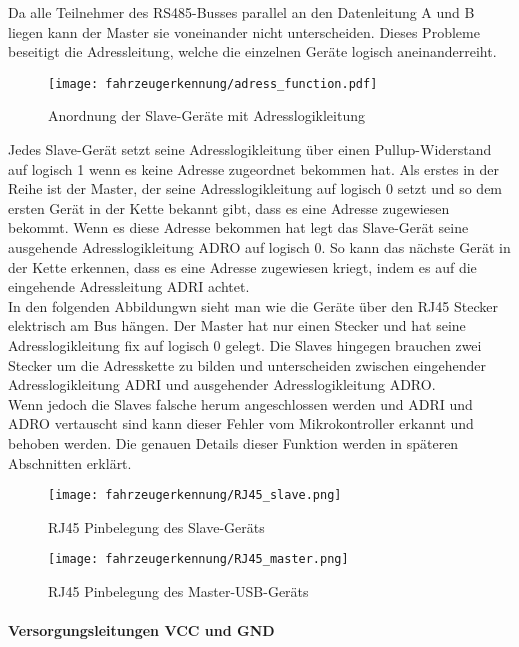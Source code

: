 Da alle Teilnehmer des RS485-Busses parallel an den Datenleitung A und B liegen kann der Master sie voneinander nicht unterscheiden. Dieses Probleme beseitigt die Adressleitung, welche
die einzelnen Geräte logisch aneinanderreiht.

\begin{figure}[H]
    \centering
    \texttt{[image: fahrzeugerkennung/adress\_function.pdf]}
    \caption{Anordnung der Slave-Geräte mit Adresslogikleitung}
\end{figure}

Jedes Slave-Gerät setzt seine Adresslogikleitung über einen Pullup-Widerstand auf logisch 1 wenn es keine Adresse zugeordnet bekommen hat.
Als erstes in der Reihe ist der Master, der seine Adresslogikleitung auf logisch 0 setzt und so dem ersten Gerät in der Kette bekannt gibt, dass es eine Adresse zugewiesen bekommt. Wenn es
diese Adresse bekommen hat legt das Slave-Gerät seine ausgehende Adresslogikleitung ADRO auf logisch 0. So kann das nächste Gerät in der Kette erkennen, dass es eine Adresse zugewiesen kriegt, 
indem es auf die eingehende Adressleitung ADRI achtet.\\
In den folgenden Abbildungwn sieht man wie die Geräte über den RJ45 Stecker elektrisch am Bus hängen. Der Master hat nur einen Stecker und hat seine Adresslogikleitung fix auf logisch 0 gelegt.
Die Slaves hingegen brauchen zwei Stecker um die Adresskette zu bilden und unterscheiden zwischen eingehender Adresslogikleitung ADRI und ausgehender Adresslogikleitung ADRO. \\
Wenn jedoch die Slaves falsche herum angeschlossen werden und ADRI und ADRO vertauscht sind kann dieser Fehler vom Mikrokontroller erkannt und behoben werden. Die genauen Details dieser Funktion 
werden in späteren Abschnitten erklärt. 

\begin{figure}[H]
    \centering
    \texttt{[image: fahrzeugerkennung/RJ45\_slave.png]}
    \caption{RJ45 Pinbelegung des Slave-Geräts}
\end{figure}

\begin{figure}[H]
    \centering
    \texttt{[image: fahrzeugerkennung/RJ45\_master.png]}
    \caption{RJ45 Pinbelegung des Master-USB-Geräts}
\end{figure}

\paragraph{Versorgungsleitungen VCC und GND}\mbox{}\\

